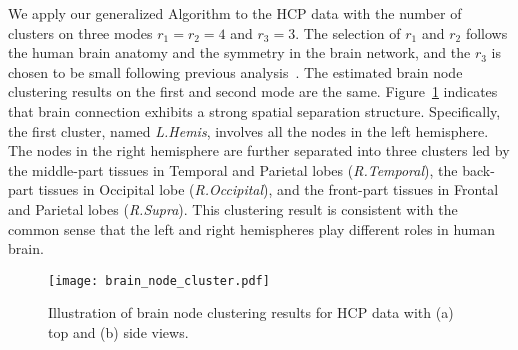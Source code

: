 \documentclass[lettersize,onecolumn,journal]{IEEEtran}
\theoremstyle{definition}
\theoremstyle{definition}
\begin{document}
We apply our generalized Algorithm to the HCP data with the number of clusters on three modes $r_1 = r_2 = 4$ and $r_3 = 3$. The selection of $r_1$ and $r_2$ follows the human brain anatomy and the symmetry in the brain network, and the $r_3$ is chosen to be small following previous analysis~\citep{hu2021generalized}. The estimated brain node clustering results on the first and second mode are the same. Figure~\ref{fig:cluster_brain} indicates that brain connection exhibits a strong spatial separation structure. Specifically, the first cluster, named \emph{L.Hemis}, involves all the nodes in the left hemisphere. The nodes in the right hemisphere are further separated into three clusters led by the middle-part tissues in Temporal and Parietal lobes (\emph{R.Temporal}), the back-part tissues in Occipital lobe (\emph{R.Occipital}), and the front-part tissues in Frontal and Parietal lobes (\emph{R.Supra}). This clustering result is consistent with the common sense that the left and right hemispheres play different roles in human brain. 


\begin{figure}[htb]
    \centering
    \texttt{[image: brain\_node\_cluster.pdf]}
    \caption{Illustration of brain node clustering results for HCP data with (a) top and (b) side views. }
    \label{fig:cluster_brain}
\end{figure}
\end{document}
